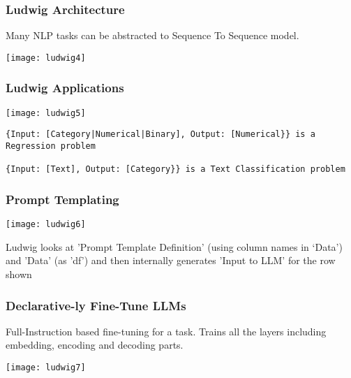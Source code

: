 \begin{frame}[fragile]\frametitle{Ludwig Architecture}

Many NLP tasks can be abstracted to Sequence To Sequence model.

		\begin{center}
		\texttt{[image: ludwig4]}
		\end{center}

\end{frame}


\begin{frame}[fragile]\frametitle{Ludwig Applications}

		\begin{center}
		\texttt{[image: ludwig5]}
		\end{center}

\begin{lstlisting}
{Input: [Category|Numerical|Binary], Output: [Numerical}} is a Regression problem 

{Input: [Text], Output: [Category}} is a Text Classification problem
\end{lstlisting}

\end{frame}

\begin{frame}[fragile]\frametitle{Prompt Templating}

		\begin{center}
		\texttt{[image: ludwig6]}
		\end{center}
		
Ludwig looks at 'Prompt Template Definition' (using column names in `Data') and 'Data' (as 'df') and then internally generates 'Input to LLM' for the row shown

\end{frame}

\begin{frame}[fragile]\frametitle{Declarative-ly Fine-Tune LLMs}

Full-Instruction based fine-tuning for a task. Trains all the layers including embedding, encoding and decoding parts.

		\begin{center}
		\texttt{[image: ludwig7]}
		\end{center}

\end{frame}

